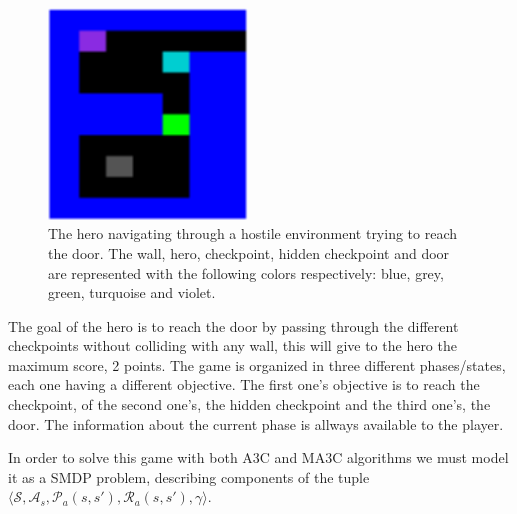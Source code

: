 \begin{figure}[hbtp]
\begin{center}
\includegraphics[width=200]{img/SimpleStates_going_up.png}
\end{center}
\caption[Simple States game]
{The hero navigating through a hostile environment trying to reach the door. The wall, hero, checkpoint, hidden checkpoint
and door are represented with the following colors respectively: blue, grey, green, turquoise and violet.}
\label{fig:SimpleStates}
\end{figure}

The goal of the hero is to reach the door by passing through the different checkpoints without colliding
with any wall, this will give to the hero the maximum score, 2 points.
The game is organized in three different phases/states, each one having a different objective.
The first one's objective is to reach the checkpoint,
of the second one's, the hidden checkpoint and the third one's, the door.
The information about the current phase is allways available to the player.

In order to solve this game with both \ac{A3C} and \ac{MA3C} algorithms we must model it as a \ac{SMDP} problem,
describing components of the tuple $\langle\mathcal{S}, \mathcal{A}_s, \mathcal{P}_a(s,s'), \mathcal{R}_a(s,s'), \gamma \rangle$.

